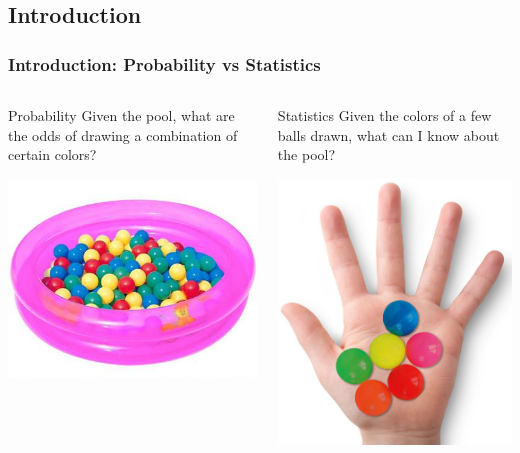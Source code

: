 \documentclass[10pt]{beamer}
\begin{document}
\subsection{Introduction}
\begin{frame}
  \frametitle{Introduction: Probability vs Statistics}
  \begin{columns}
    \begin{block}{Probability}
      Given the pool, what are the odds of drawing a combination of certain colors?
      \begin{center}
      \includegraphics[height=.35\textheight]{img/ballpool}
      \end{center}
    \end{block}
    \begin{block}{Statistics}
      Given the colors of a few balls drawn, what can I know about the pool?
      \begin{center}
      \includegraphics[height=.35\textheight]{img/ballhand}

\end{center}
\end{block}
\end{columns}
\end{frame}
\end{document}
